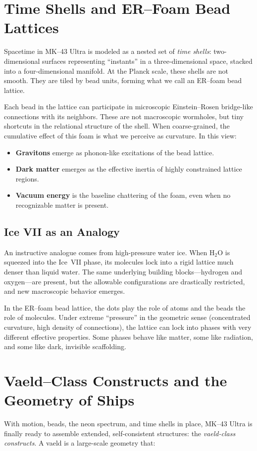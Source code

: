 \chapter{Time Shells and ER--Foam Bead Lattices}
Spacetime in MK--43 Ultra is modeled as a nested set of \emph{time shells}:
two-dimensional surfaces representing ``instants'' in a three-dimensional
space, stacked into a four-dimensional manifold. At the Planck scale, these
shells are not smooth. They are tiled by bead units, forming what we call an
ER--foam bead lattice.

Each bead in the lattice can participate in microscopic Einstein--Rosen
bridge-like connections with its neighbors. These are not macroscopic
wormholes, but tiny shortcuts in the relational structure of the shell. When
coarse-grained, the cumulative effect of this foam is what we perceive as
curvature. In this view:

\begin{itemize}
  \item \textbf{Gravitons} emerge as phonon-like excitations of the bead
  lattice.
  \item \textbf{Dark matter} emerges as the effective inertia of highly
  constrained lattice regions.
  \item \textbf{Vacuum energy} is the baseline chattering of the foam, even
  when no recognizable matter is present.
\end{itemize}

\section{Ice VII as an Analogy}
An instructive analogue comes from high-pressure water ice. When H$_2$O is
squeezed into the Ice~VII phase, its molecules lock into a rigid lattice much
denser than liquid water. The same underlying building blocks---hydrogen and
oxygen---are present, but the allowable configurations are drastically
restricted, and new macroscopic behavior emerges.

In the ER--foam bead lattice, the dots play the role of atoms and the beads
the role of molecules. Under extreme ``pressure'' in the geometric sense
(concentrated curvature, high density of connections), the lattice can lock
into phases with very different effective properties. Some phases behave like
matter, some like radiation, and some like dark, invisible scaffolding.

\chapter{Vaeld--Class Constructs and the Geometry of Ships}
With motion, beads, the neon spectrum, and time shells in place, MK--43 Ultra
is finally ready to assemble extended, self-consistent structures: the
\emph{vaeld-class constructs}. A vaeld is a large-scale geometry that:

